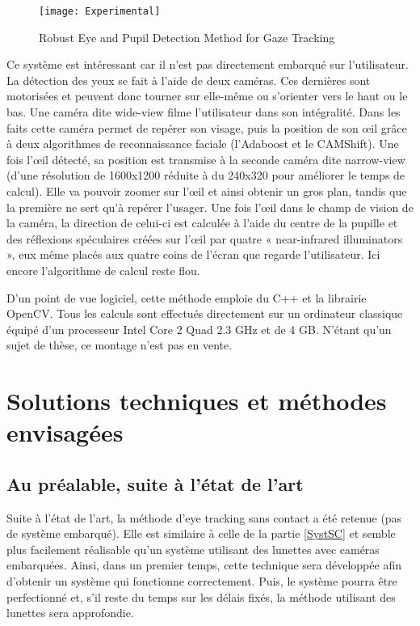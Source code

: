 \begin{figure}[H]
  \centering
  \texttt{[image: Experimental]}
  \caption{Robust Eye and Pupil Detection Method for Gaze Tracking}
  \label{fig:Experimental}
\end{figure}

Ce système est intéressant car il n’est pas directement embarqué sur l’utilisateur. La détection des yeux se fait à l’aide de deux caméras. Ces dernières sont motorisées et peuvent donc tourner sur elle-même ou s’orienter vers le haut ou le bas. 
Une caméra dite wide-view filme l’utilisateur dans son intégralité. Dans les faits cette caméra permet de repérer son visage, puis la position de son œil grâce à deux algorithmes de reconnaissance faciale (l’Adaboost et le CAMShift). Une fois l’œil détecté, sa position est transmise à la seconde caméra dite narrow-view (d’une résolution de 1600x1200 réduite à du 240x320 pour améliorer le temps de calcul). Elle va pouvoir zoomer sur l’œil et ainsi obtenir un gros plan, tandis que la première ne sert qu’à repérer l’usager. Une fois l’œil dans le champ de vision de la caméra, la direction de celui-ci est calculée à l’aide du centre de la pupille et des réflexions spéculaires créées sur l’œil par quatre « near-infrared illuminators », eux même placés aux quatre coins de l’écran que regarde l’utilisateur. Ici encore l’algorithme de calcul reste flou.

D’un point de vue logiciel, cette méthode emploie du C++ et la librairie OpenCV. Tous les calculs sont effectués directement sur un ordinateur classique équipé d’un processeur Intel Core 2 Quad 2.3 GHz et de 4 GB.
N’étant qu’un sujet de thèse, ce montage n’est pas en vente.

\section{Solutions techniques et méthodes envisagées} 

\subsection{Au préalable, suite à l'état de l'art}

Suite à l’état de l’art, la méthode d’eye tracking sans contact a été retenue (pas de système embarqué). Elle est similaire à celle de la partie \ref{SystSC} et semble plus facilement réalisable qu'un système utilisant des lunettes avec caméras embarquées. Ainsi, dans un premier temps, cette technique sera développée afin d’obtenir un système qui fonctionne correctement. Puis, le système pourra être perfectionné et, s’il reste du temps sur les délais fixés, la méthode utilisant des lunettes sera approfondie. 

